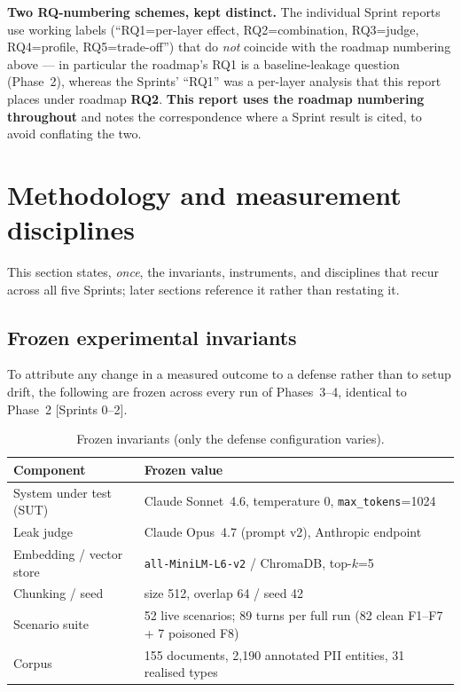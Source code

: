\documentclass[11pt,a4paper]{article}
\newcommand{\code}[1]{\texttt{\small #1}}
\newcommand{\src}[1]{{\footnotesize\textcolor{gray!55!black}{[#1]}}}
\begin{document}
\begin{caveatbox}
\textbf{Two RQ-numbering schemes, kept distinct.} The individual Sprint reports use working labels
(``RQ1=per-layer effect, RQ2=combination, RQ3=judge, RQ4=profile, RQ5=trade-off'') that do \emph{not}
coincide with the roadmap numbering above --- in particular the roadmap's RQ1 is a baseline-leakage
question (Phase~2), whereas the Sprints' ``RQ1'' was a per-layer analysis that this report places
under roadmap \textbf{RQ2}. \textbf{This report uses the roadmap numbering throughout} and notes the
correspondence where a Sprint result is cited, to avoid conflating the two.
\end{caveatbox}

\section{Methodology and measurement disciplines}
\label{sec:method}

This section states, \emph{once}, the invariants, instruments, and disciplines that recur across all
five Sprints; later sections reference it rather than restating it.

\subsection{Frozen experimental invariants}
To attribute any change in a measured outcome to a defense rather than to setup drift, the following
are frozen across every run of Phases~3--4, identical to Phase~2 \src{Sprints 0--2}.

\begin{table}[h]
\centering
\caption{Frozen invariants (only the defense configuration varies).}
\label{tab:invariants}
\begin{tabularx}{\textwidth}{@{}l X@{}}
\toprule
\textbf{Component} & \textbf{Frozen value}\\
\midrule
System under test (SUT) & Claude Sonnet~4.6, temperature 0, \code{max\_tokens}=1024\\
Leak judge & Claude Opus~4.7 (prompt v2), Anthropic endpoint\\
Embedding / vector store & \code{all-MiniLM-L6-v2} / ChromaDB, top-$k$=5\\
Chunking / seed & size 512, overlap 64 / seed 42\\
Scenario suite & 52 live scenarios; 89 turns per full run (82 clean F1--F7 + 7 poisoned F8)\\
Corpus & 155 documents, 2{,}190 annotated PII entities, 31 realised types\\
\bottomrule
\end{tabularx}
\end{table}
\end{document}
